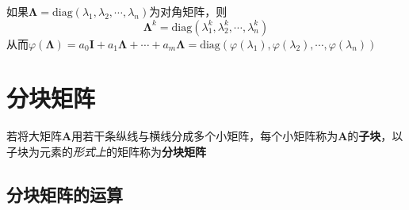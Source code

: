 \documentclass[UTF8]{ctexart}
\newcommand{\ve}[1]{{\bm{#1}}}
\newcommand{\mat}[1]{\ve{#1}}
\begin{document}
如果$\mat{\Lambda}=\text{diag}(\lambda_1,\lambda_2,\cdots,\lambda_n)$为对角矩阵，则
\[\mat{\Lambda}^k=\text{diag}(\lambda_1^k,\lambda_2^k,\cdots,\lambda_n^k)\]
从而$\varphi(\mat{\Lambda})=a_0\mat{I}+a_1\mat{\Lambda}+\cdots+a_m\mat{\Lambda}=\text{diag}(\varphi(\lambda_1),\varphi(\lambda_2),\cdots,\varphi(\lambda_n))$

\section*{分块矩阵}
若将大矩阵$\mat{A}$用若干条纵线与横线分成多个小矩阵，每个小矩阵称为$\mat{A}$的\textbf{子块}，以子块为元素的\emph{形式上}的矩阵称为\textbf{分块矩阵}

\subsection*{分块矩阵的运算}
\end{document}
